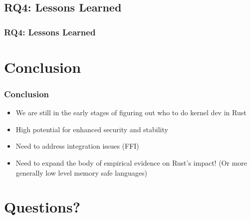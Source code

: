\documentclass{beamer}
\begin{document}
\subsection{RQ4: Lessons Learned}

\begin{frame}
  \frametitle{RQ4: Lessons Learned}

\end{frame}


\section{Conclusion}

\begin{frame}
  \frametitle{Conclusion}
  \begin{itemize}
  \item<1-> We are still in the early stages of figuring out who to do kernel dev in Rust
  \item<2-> High potential for enhanced security and stability
  \item<3-> Need to address integration issues (FFI)
  \item<4-> Need to expand the body of empirical evidence on Rust's impact! (Or more generally low
    level memory safe languages)
  \end{itemize}

\end{frame}

\section{Questions?}
\end{document}
